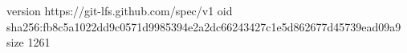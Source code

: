 version https://git-lfs.github.com/spec/v1
oid sha256:fb8c5a1022dd9c0571d9985394e2a2dc66243427c1e5d862677d45739ead09a9
size 1261

